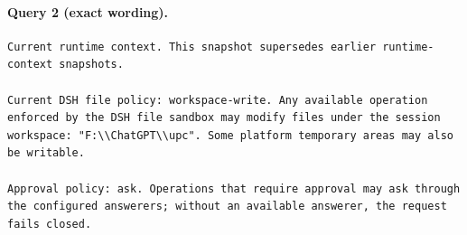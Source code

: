 \documentclass[UTF8,10pt]{ctexart}
\begin{document}
\paragraph{Query 2 (exact wording).}
\begin{Verbatim}[breaklines=true,breakanywhere=true,fontsize=\scriptsize,frame=single,framesep=2pt]
Current runtime context. This snapshot supersedes earlier runtime-context snapshots.

Current DSH file policy: workspace-write. Any available operation enforced by the DSH file sandbox may modify files under the session workspace: "F:\\ChatGPT\\upc". Some platform temporary areas may also be writable.

Approval policy: ask. Operations that require approval may ask through the configured answerers; without an available answerer, the request fails closed.
\end{Verbatim}
\end{document}

